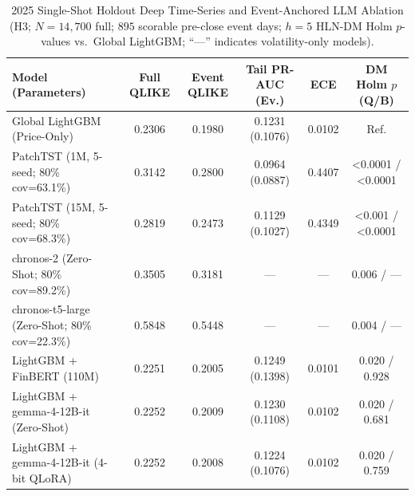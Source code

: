 \begin{table}[!htb]
\centering
\caption{2025 Single-Shot Holdout Deep Time-Series and Event-Anchored LLM Ablation (H3; $N=14{,}700$ full; $895$ scorable pre-close event days; $h=5$ HLN-DM Holm $p$-values vs.\ Global LightGBM; ``---'' indicates volatility-only models).}
\label{tab:h3_summary}
\scriptsize
\setlength{\tabcolsep}{3.5pt}
\begin{tabular}{lccccc}
\toprule
Model (Parameters) & Full QLIKE & Event QLIKE & Tail PR-AUC (Ev.) & ECE & DM Holm $p$ (Q/B) \\
\midrule
Global LightGBM (Price-Only) & 0.2306 & 0.1980 & 0.1231 (0.1076) & 0.0102 & Ref. \\
PatchTST (1M, 5-seed; 80\% cov=63.1\%) & 0.3142 & 0.2800 & 0.0964 (0.0887) & 0.4407 & <0.0001 / <0.0001 \\
PatchTST (15M, 5-seed; 80\% cov=68.3\%) & 0.2819 & 0.2473 & 0.1129 (0.1027) & 0.4349 & <0.001 / <0.0001 \\
chronos-2 (Zero-Shot; 80\% cov=89.2\%) & 0.3505 & 0.3181 & --- & --- & 0.006 / --- \\
chronos-t5-large (Zero-Shot; 80\% cov=22.3\%) & 0.5848 & 0.5448 & --- & --- & 0.004 / --- \\
LightGBM + FinBERT (110M) & 0.2251 & 0.2005 & 0.1249 (0.1398) & 0.0101 & 0.020 / 0.928 \\
LightGBM + gemma-4-12B-it (Zero-Shot) & 0.2252 & 0.2009 & 0.1230 (0.1108) & 0.0102 & 0.020 / 0.681 \\
LightGBM + gemma-4-12B-it (4-bit QLoRA) & 0.2252 & 0.2008 & 0.1224 (0.1076) & 0.0102 & 0.020 / 0.759 \\
\bottomrule
\end{tabular}
\end{table}

